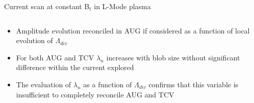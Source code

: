 \documentclass[10pt, compress]{beamer}
\begin{document}
\begin{frame}{Current scan at constant B$_t$ in L-Mode plasma}
\begin{columns}
\begin{column}{0.4\textwidth}
\begin{itemize}
        \item<only@11> Amplitude evolution reconciled in AUG if
          considered as a function of local evolution of $\Lambda_{div}$
        \item<only@12> For both AUG and TCV $\lambda_n$ increases
          with blob size without significant difference within the
          current explored
        \item<only@13> \alert{The evaluation of $\lambda_n$ as a
          function of $\Lambda_{div}$ confirms that this variable is
          insufficient to completely reconcile AUG and TCV}
      \end{itemize}
    \end{column}
  \end{columns}
\end{frame}  
\end{document}
